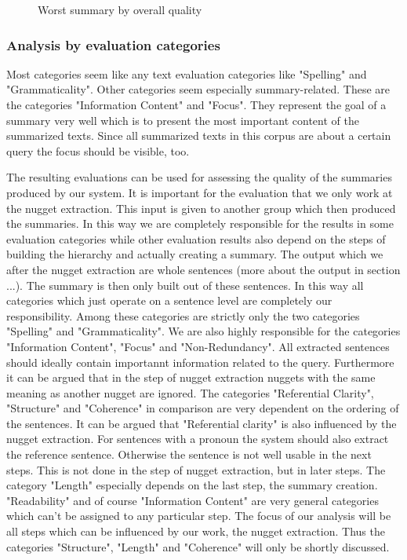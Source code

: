 \begin{figure}
	\caption{Worst summary by overall quality}
	\label{worst_summary}
	\noindent{}	
\end{figure} 


\subsubsection{Analysis by evaluation categories}
Most categories seem like any text evaluation categories like "Spelling" and "Grammaticality". Other categories seem especially summary-related. These are the categories "Information Content" and "Focus". They represent the goal of a summary very well which is to present the most important content of the summarized texts. Since all summarized texts in this corpus are about a certain query the focus should be visible, too.

The resulting evaluations can be used for assessing the quality of the summaries produced by our system. It is important for the evaluation that we only work at the nugget extraction. This input is given to another group which then produced the summaries. In this way we are completely responsible for the results in some evaluation categories while other evaluation results also depend on the steps of  building the hierarchy and actually creating a summary. The output which we after the nugget extraction are whole sentences (more about the output in section ...). The summary is then only built out of these sentences. In this way all categories which just operate on a sentence level are completely our responsibility. Among these categories are strictly only the two categories "Spelling" and "Grammaticality". We are also highly responsible for the categories "Information Content", "Focus" and "Non-Redundancy". All extracted sentences should ideally contain importannt information related to the query. Furthermore it can be argued that in the step of nugget extraction nuggets with the same meaning as another nugget are ignored. The categories "Referential Clarity", "Structure" and "Coherence" in comparison are very dependent on the ordering of the sentences. It can be argued that "Referential clarity" is also influenced by the nugget extraction. For sentences with a pronoun the system should also extract the reference sentence. Otherwise the sentence is not well usable in the next steps. This is not done in the step of nugget extraction, but in later steps. The category "Length" especially depends on the last step, the summary creation. "Readability" and of course "Information Content" are very general categories which can't be assigned to any particular step. The focus of our analysis will be all steps which can be influenced by our work, the nugget extraction. Thus the categories "Structure", "Length" and "Coherence" will only be shortly discussed.

